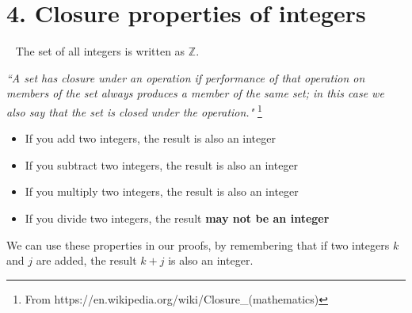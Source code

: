 \documentclass[a4paper,12pt]{book}
\newcounter{question}
\begin{document}
\begin{questionNOGRADE}{\thequestion}
        \end{questionNOGRADE}

    \newpage

    \section*{4. Closure properties of integers}

        \begin{intro}{\ }
            The set of all integers is written as $\mathbb{Z}$.

            \begin{center}
                \textit{``A set has closure under an operation if
                performance of that operation on members of the set
                always produces a member of the same set; in this
                case we also say that the set is closed under the operation."}
                \footnote{From https://en.wikipedia.org/wiki/Closure\_(mathematics)}
            \end{center}

            \begin{itemize}
                \item   If you add two integers, the result is also an integer
                \item   If you subtract two integers, the result is also an integer
                \item   If you multiply two integers, the result is also an integer
                \item   If you divide two integers, the result \textbf{may not be an integer}
            \end{itemize}

            We can use these properties in our proofs, by remembering that
            if two integers $k$ and $j$ are added, the result $k+j$ is also an integer.
        \end{intro}
\end{document}
